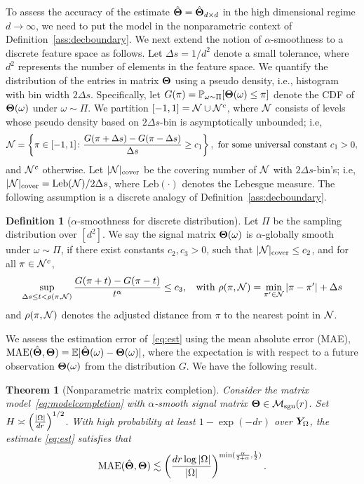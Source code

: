 \documentclass[aos]{imsart}
\newtheorem{theorem}{Theorem}%
\theoremstyle{definition}
\newtheorem{definition}{Definition}
\def\caliM{\tM_{\textup{sgn}}}
\begin{document}
\noindent
To assess the accuracy of the estimate $\hat {\bm{\Theta}}=\hat {\bm{\Theta}}_{d\times d}$ in the high dimensional regime $d\to \infty$, we need to put the model in the nonparametric context of Definition~\ref{ass:decboundary}. We next extend the notion of $\alpha$-smoothness to a discrete feature space as follows. Let $\Delta s = 1/d^2$ denote a small tolerance, where $d^2$ represents the number of elements in the feature space. We quantify the distribution of the entries in matrix $\bm{\Theta}$ using a pseudo density, i.e., histogram with bin width $2\Delta s$. Specifically, let $G(\pi)=\mathbb{P}_{\omega\sim \Pi}[\bm{\Theta}(\omega)\leq \pi]$ denote the CDF of $\bm{\Theta}(\omega)$ under $\omega\sim \Pi$. We partition $[-1,1]=\mathcal{N} \cup \mathcal{N}^c$, where $\mathcal{N}$ consists of levels whose pseudo density based on $2\Delta s$-bin is asymptotically unbounded; i.e,
\[
\mathcal{N}=\left\{\pi\in[-1,1] \colon {G(\pi+{\Delta s})-G(\pi-{\Delta s})\over \Delta s} \geq c_1 \right\},\ \text{for some universal constant }c_1>0,
\]
and $\mathcal{N}^c$ otherwise. Let $|\mathcal{N}|_{\text{cover}}$ be the covering number of $\mathcal{N}$ with $2\Delta s$-bin's; i.e, $|\mathcal{N}|_{\text{cover}} =\text{Leb}(\mathcal{N})/2\Delta s$, where $\text{Leb}(\cdot)$ denotes the Lebesgue measure. The following assumption is a discrete analogy of Definition~\ref{ass:decboundary}.

\begin{definition}[$\alpha$-smoothness for discrete distribution] Let $\Pi$ be the sampling distribution over $[d^2]$. We say the signal matrix $\bm{\Theta}(\omega)$ is $\alpha$-globally smooth under $\omega\sim \Pi$, if there exist constants $c_2,c_3>0$, such that $|\mathcal{N}|_{\text{cover}}\leq c_2$, and for all $\pi \in\mathcal{N}^c$, 
\begin{equation*} \label{eq:smooth}
\sup_{\Delta s \leq t<\rho(\pi, \tN)}{G(\pi+{t})-G(\pi-{t})\over t^\alpha} \leq c_3, \;\; \text{ with } \rho(\pi,\tN)=\min_{\pi'\in \tN}|\pi-\pi'|+\Delta s 
\end{equation*}
and $\rho(\pi,\mathcal{N})$ denotes the adjusted distance from $\pi$ to the nearest point in $\mathcal{N}$. 
\end{definition}
We assess the estimation error of~\eqref{eq:est} using the mean absolute error (MAE), $\text{MAE}(\hat {\bm{\Theta}}, \bm{\Theta}) = \mathbb{E}|\hat {\bm{\Theta}}(\omega)-\bm{\Theta}(\omega)|$, where the expectation is with respect to a future observation $\bm{\Theta}(\omega)$ from the distribution $G$.  We have the following result. 

\begin{theorem}[Nonparametric matrix completion]\label{thm:estimation} 
Consider the matrix model~\eqref{eq:modelcompletion} with $\alpha$-smooth signal matrix $\mTheta\in\caliM(r)$. Set $H \asymp \left( |\Omega|\over dr\right)^{1/2}$. With high probability at least $1-\exp(-dr)$ over $\bm Y_\Omega$, the estimate \eqref{eq:est} satisfies that
\begin{equation}\label{eq:real}
\textup{MAE}(\hat \mTheta, \mTheta)\lesssim \left(dr \log|\Omega| \over |\Omega|\right)^{\min({\alpha \over 2+\alpha}, {1\over 2})}.
\end{equation}
\end{theorem}
\end{document}
